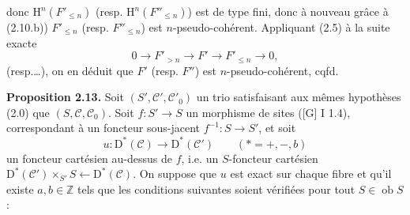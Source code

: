 \documentclass[11pt]{article}
\newcommand{\Spec}{\operatorname{Spec}}
\newcommand{\RRR}{\mathrm{RRR}}
\providecommand{\cC}{\mathcal C}
\providecommand{\Coker}{\operatorname{Coker}}
\providecommand{\Ker}{\operatorname{Ker}}
\providecommand{\cO}{\mathcal O}
\begin{document}
\providecommand{\cS}{\mathcal S}
\providecommand{\cD}{\mathcal D}
\providecommand{\cE}{\mathscr E}
\providecommand{\cG}{\mathscr G}
\providecommand{\cL}{\mathscr L}
\providecommand{\cM}{\mathscr M}
\providecommand{\cP}{\mathscr P}
\providecommand{\cK}{\mathcal K}
\providecommand{\Db}{\mathrm D}
\providecommand{\Kb}{\mathrm K}
\providecommand{\Trc}{\operatorname{Tr}}
\providecommand{\ob}{\operatorname{ob}}
\providecommand{\Coh}{\operatorname{Coh}}
\providecommand{\Cone}{\operatorname{Cone}}
\providecommand{\im}{\operatorname{Im}}
\providecommand{\Id}{\operatorname{Id}}
\providecommand{\RR}{\mathrm{R.R.}}
\providecommand{\RRR}{\mathrm{R.R.R.}}
\providecommand{\GrR}{\mathrm{G}}
\providecommand{\pr}{\operatorname{pr}}
\providecommand{\cC}{\mathcal C}
\providecommand{\cD}{\mathcal D}
\providecommand{\cK}{\mathcal K}
\providecommand{\cO}{\mathcal O}
\providecommand{\cS}{\mathcal S}
\providecommand{\Cpx}{\mathrm C}
\providecommand{\Kpx}{\mathrm K}
\providecommand{\Dpx}{\mathrm D}
\providecommand{\D}{\mathrm D}
\providecommand{\Ho}{\mathrm H}
\providecommand{\RHom}{\mathrm R\!\operatorname{Hom}}
\providecommand{\Ob}{\operatorname{ob}}
\providecommand{\Coker}{\operatorname{Coker}}
\providecommand{\Ker}{\operatorname{Ker}}
\renewcommand{\Im}{\operatorname{Im}}
\providecommand{\Hom}{\operatorname{Hom}}
\providecommand{\Cone}{\operatorname{Cone}}
\providecommand{\id}{\operatorname{Id}}
\providecommand{\qis}{\xrightarrow{\sim}}
\providecommand{\RHom}{\mathrm R\!\Hom}
\providecommand{\Ext}{\operatorname{Ext}}
\providecommand{\coh}{\operatorname{coh}}
\providecommand{\PreCoh}{\operatorname{precoh}}
\providecommand{\Tr}{\operatorname{Tr}}
\providecommand{\Qis}{\operatorname{Qis}}
\providecommand{\Rad}{\operatorname{rad}}
\providecommand{\Spec}{\operatorname{Spec}}
\providecommand{\End}{\operatorname{End}}
\providecommand{\Id}{\operatorname{Id}}
\providecommand{\varinjlim}{\mathop{\mathrm{lim}}\limits_{\longrightarrow}}
\providecommand{\varprojlim}{\mathop{\mathrm{lim}}\limits_{\longleftarrow}}
\providecommand{\qcoh}{\operatorname{qcoh}}
\providecommand{\amp}{\operatorname{amp}}
donc \(\Ho^n(F'_{\leq n})\) (resp. \(\Ho^n(F''_{\leq n})\)) est de type fini, donc à nouveau grâce à (2.10.b)) \(F'_{\leq n}\) (resp. \(F''_{\leq n}\)) est \(n\)-pseudo-cohérent. Appliquant (2.5) à la suite exacte
\[
  0\longrightarrow F'_{>n}\longrightarrow F'\longrightarrow F'_{\leq n}\longrightarrow 0,
\]
(resp.\dots), on en déduit que \(F'\) (resp. \(F''\)) est \(n\)-pseudo-cohérent, cqfd.

\textbf{Proposition 2.13.} Soit \((S',\mathcal C',\mathcal C'_0)\) un trio satisfaisant aux mêmes hypothèses (2.0) que \((S,\mathcal C,\mathcal C_0)\). Soit \(f:S'\to S\) un morphisme de sites ([G] I 1.4), correspondant à un foncteur sous-jacent \(f^{-1}:S\to S'\), et soit
\[
  u:\Dpx^*(\mathcal C)\longrightarrow \Dpx^*(\mathcal C')\qquad (*=+,-,b)
\]
un foncteur cartésien au-dessus de \(f\), i.e. un \(S\)-foncteur cartésien \(\Dpx^*(\mathcal C')\times_{S'}S\longleftarrow\Dpx^*(\mathcal C)\). On suppose que \(u\) est exact sur chaque fibre et qu'il existe \(a,b\in\mathbb Z\) tels que les conditions suivantes soient vérifiées pour tout \(S\in\Ob S\) :
\end{document}
